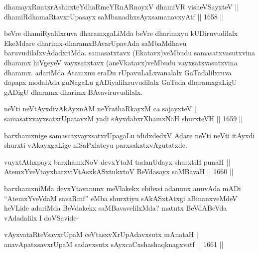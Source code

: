 \begin{shl}
dhamayxRnatxrAshirxteYdhaRmeYRnARnoyxV dhamiVR visheVSayxteV || \\
dhamiRdhamaRtavxrUpasayx saMbanadhxsAyxsamanavxyAtf \hfill || 1658 ||  
\end{shl}

\begin{artha}
beVre dhamiRyalilxruva dharamxgaLiMda beVre dharimxyu kUDiruvudilalx EkeMdare dharimx-dharamxBAvarUpavAda saMbaMdhavu baruvudilalxvAdadxriMda. samasatxtavx (Ekatavx)veMbudu samasatxvasutxvina dharamx hiVgeyeV vayxsatxtavx (aneVkatavx)veMbudu vayxsatxvasutxvina dharamx. adariMda Atamxnu eraDu rUpavuLaLxvanalalx GaTadalilxruva dapapx modalAda guNagaLu gADiyalilxruvudilalx GaTada dharamxgaLigU gADigU dharamx dharimx BAvaviruvudilalx.
\end{artha}


\begin{shl}
neVti neVtAyxdivAkAyxnAM neYrathaRkayxM ca sajayxteV || \\
samasatxvayxsatxrUpatavxM yadi sAyxdabxrXhamxNaH shurxteVH \hfill || 1659 ||  
\end{shl}

\begin{artha}
barxhamxnige samasatxvayxsatxrUpagaLu ididxdedxV Adare neVti neVti itAyxdi shurxti vAkayxgaLige niSaPxlateyu parxsakatxvAgutatxde.
\end{artha}


\begin{shl}
vuyxtAthxpayx barxhamxNoV devxYtaM tadanUdayx shurxtiH punaH || \\
AtemxYveVtayxbarxviVtAsxkASxtukxtoV BeVdasayx saMBavaH \hfill || 1660 ||  
\end{shl}

\begin{artha}
barxhamxniMda devxYtavanunx meVlakekx ebibxsi adanunx anuvAda mADi ``AtemxYveVdaM savaRmf'' eMba shurxtiyu sAkASxtAtxgi aBinanxveMdeV heVLide adariMda BeVdakekx saMBavavelilxMda? matutx BeVdABeVda vAdadalilx I doVSavide-
\end{artha}

\begin{shl}
vAyxvataRteV\s savxrUpaM ceVtasxvXrUpAdavxsutx mAnataH || \\
anavApatxsavxrUpaM sadavxsutx sAyxcaCxshashaqknagxvatf \hfill || 1661 ||  
\end{shl}

